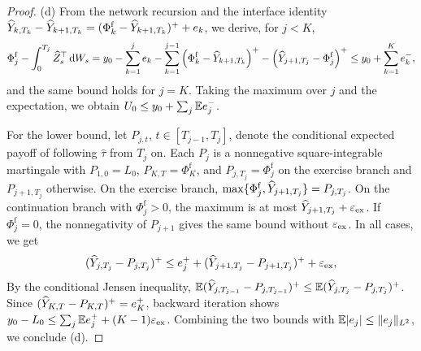 \begin{proof}
(d) From the network recursion and the interface identity $\widehat Y_{k,T_k}-\widehat Y_{k+1,T_k}=(\Phi^{\mathrm f}_k-\widehat Y_{k+1,T_k})^++e_k$, we derive, for $j<K$,
\[
\Phi^{\mathrm f}_j-\int_0^{T_j}\widehat Z_s^\top\,\mathrm{d} W_s=y_0-\sum_{k=1}^je_k-\sum_{k=1}^{j-1}\left(\Phi^{\mathrm f}_k-\widehat Y_{k+1,T_k}\right)^+-\left(\widehat Y_{j+1,T_j}-\Phi^{\mathrm f}_j\right)^+\le y_0+\sum_{k=1}^Ke_k^- ,
\]
and the same bound holds for $j=K$. Taking the maximum over $j$ and the expectation, we obtain $U_0\le y_0+\sum_j\mathbb{E} e_j^-$.

For the lower bound, let $P_{j,t}$, $t\in[T_{j-1},T_j]$, denote the conditional expected payoff of following $\hat\tau$ from $T_j$ on. Each $P_j$ is a nonnegative square-integrable martingale with $P_{1,0}=L_0$, $P_{K,T}=\Phi^{\mathrm f}_K$, and $P_{j,T_j}=\Phi^{\mathrm f}_j$ on the exercise branch and $P_{j+1,T_j}$ otherwise. On the exercise branch, $\max\{\Phi^{\mathrm f}_j,\widehat Y_{j+1,T_j}\}=P_{j,T_j}$. On the continuation branch with $\Phi^{\mathrm f}_j>0$, the maximum is at most $\widehat Y_{j+1,T_j}+\varepsilon_{\mathrm{ex}}$. If $\Phi^{\mathrm f}_j=0$, the nonnegativity of $P_{j+1}$ gives the same bound without $\varepsilon_{\mathrm{ex}}$. In all cases, we get
\[
(\widehat Y_{j,T_j}-P_{j,T_j})^+\le e_j^++(\widehat Y_{j+1,T_j}-P_{j+1,T_j})^++\varepsilon_{\mathrm{ex}} ,
\]
By the conditional Jensen inequality, $\mathbb{E}(\widehat Y_{j,T_{j-1}}-P_{j,T_{j-1}})^+\le\mathbb{E}(\widehat Y_{j,T_j}-P_{j,T_j})^+$. Since $(\widehat Y_{K,T}-P_{K,T})^+=e_K^+$, backward iteration shows $y_0-L_0\le\sum_j\mathbb{E} e_j^++(K-1)\varepsilon_{\mathrm{ex}}$. Combining the two bounds with $\mathbb{E}\lvert e_j\rvert\le\lVert e_j\rVert_{L^2}$, we conclude (d).
\end{proof}
